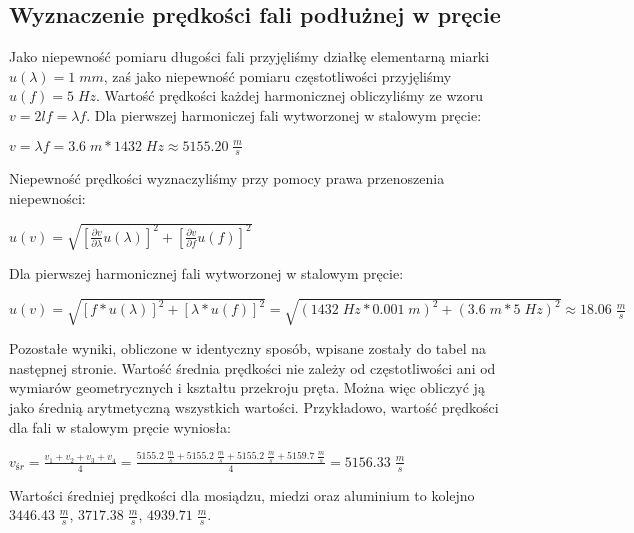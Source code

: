 \documentclass[12pt]{article}
\begin{document}
\subsection{Wyznaczenie prędkości fali podłużnej w pręcie}
Jako niepewność pomiaru długości fali przyjęliśmy działkę elementarną miarki $u(\lambda)=1\;mm$, zaś jako niepewność pomiaru częstotliwości przyjęliśmy 
$u(f)=5\;Hz$. Wartość prędkości każdej harmonicznej obliczyliśmy ze wzoru $v=2lf=\lambda{f}$. Dla pierwszej harmoniczej fali wytworzonej \newline w stalowym pręcie:
\begin{center}
\Large $v=\lambda{f}=3.6\;m*1432\;Hz\approx5155.20\;\frac{m}{s}$
\end{center}
Niepewność prędkości wyznaczyliśmy przy pomocy prawa przenoszenia niepewności:
\begin{center}
\Large $u(v)=\sqrt{[\frac{\partial{v}}{\partial{\lambda}}u(\lambda)]^2+[\frac{\partial{v}}{\partial{f}}u(f)]^2}$
\end{center}
Dla pierwszej harmonicznej fali wytworzonej w stalowym pręcie:
\begin{center}
\Large $u(v)=\sqrt{[f*u(\lambda)]^2+[\lambda*u(f)]^2}=\sqrt{(1432\;Hz*0.001\;m)^2+(3.6\;m*5\;Hz)^2}\approx18.06\;\frac{m}{s}$
\end{center}
Pozostałe wyniki, obliczone w identyczny sposób, wpisane zostały do tabel na następnej stronie. \newline
Wartość średnia prędkości nie zależy od częstotliwości ani od wymiarów geometrycznych i kształtu przekroju pręta. Można więc obliczyć ją jako średnią arytmetyczną wszystkich wartości. Przykładowo, wartość prędkości dla fali w stalowym pręcie wyniosła:
\begin{center}
\Large $v_{śr}=\frac{v_1+v_2+v_3+v_4}{4}=\frac{5155.2\;\frac{m}{s}+5155.2\;\frac{m}{s}+5155.2\;\frac{m}{s}+5159.7\;\frac{m}{s}}{4}=5156.33\;\frac{m}{s}$
\end{center}
Wartości średniej prędkości dla mosiądzu, miedzi oraz aluminium to kolejno $3446.43\;\frac{m}{s}$, $3717.38\;\frac{m}{s}$, $4939.71\;\frac{m}{s}$.
\end{document}
